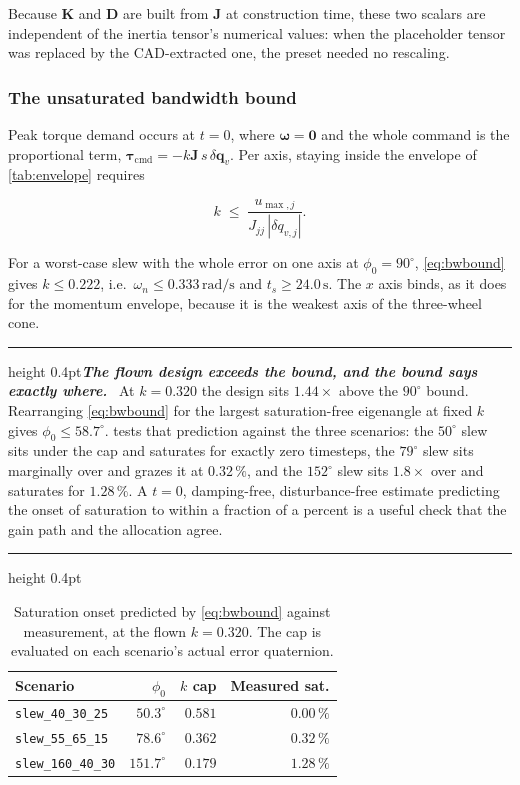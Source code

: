 \documentclass[conference,10pt,a4paper]{IEEEtran}
\newcommand{\remarkrule}{\par\nobreak\vspace{2pt}%
  \hrule height 0.4pt\vspace{4pt}\nobreak}
\newenvironment{keybox}[1][Result]
  {\par\medskip\remarkrule\noindent\small\textbf{\textit{#1.}}\ \ignorespaces}
  {\par\vspace{3pt}\hrule height 0.4pt\par\medskip\ignorespacesafterend}
\newcommand{\vect}[1]{\bm{#1}}
\newcommand{\mat}[1]{\bm{#1}}
\newcommand{\unit}[1]{\ensuremath{\,\mathrm{#1}}}
\begin{document}
Because $\mat{K}$ and $\mat{D}$ are built from $\mat{J}$ at construction time,
these two scalars are independent of the inertia tensor's numerical values:
when the placeholder tensor was replaced by the CAD-extracted one, the preset
needed no rescaling.

\subsubsection{The unsaturated bandwidth bound}

Peak torque demand occurs at $t=0$, where $\vect{\omega}=\vect{0}$ and the
whole command is the proportional term, $\vect{\tau}_\text{cmd}=-k\mat{J}\,
s\,\delta\vect{q}_v$. Per axis, staying inside the envelope of
\cref{tab:envelope} requires

\begin{equation}
k \;\le\; \frac{u_{\max,j}}{J_{jj}\,|\delta q_{v,j}|} .
\label{eq:bwbound}
\end{equation}

For a worst-case slew with the whole error on one axis at
$\phi_0=90^\circ$, \cref{eq:bwbound} gives $k\le0.222$, i.e.\
$\omega_n\le0.333\unit{rad/s}$ and $t_s\ge24.0\unit{s}$. The $x$ axis binds, as
it does for the momentum envelope, because it is the weakest axis of the
three-wheel cone.

\begin{keybox}[The flown design exceeds the bound, and the bound says exactly where]
At $k=0.320$ the design sits $1.44\times$ above the $90^\circ$ bound.
Rearranging \cref{eq:bwbound} for the largest saturation-free eigenangle at
fixed $k$ gives $\phi_0\le58.7^\circ$. \Cref{tab:satonset} tests that
prediction against the three scenarios: the $50^\circ$ slew sits under the cap
and saturates for exactly zero timesteps, the $79^\circ$ slew sits marginally
over and grazes it at $0.32\,\%$, and the $152^\circ$ slew sits $1.8\times$
over and saturates for $1.28\,\%$. A $t=0$, damping-free, disturbance-free
estimate predicting the onset of saturation to within a fraction of a percent
is a useful check that the gain path and the allocation agree.
\end{keybox}

\begin{table}[!t]
\centering
\caption{Saturation onset predicted by \cref{eq:bwbound} against measurement,
at the flown $k=0.320$. The cap is evaluated on each scenario's actual error
quaternion.}
\label{tab:satonset}
\footnotesize
\begin{tabular}{@{}lrrr@{}}
\toprule
Scenario & $\phi_0$ & $k$ cap & Measured sat. \\
\midrule
\texttt{slew\_40\_30\_25}  & $50.3^\circ$  & $0.581$ & $0.00\,\%$ \\
\texttt{slew\_55\_65\_15}  & $78.6^\circ$  & $0.362$ & $0.32\,\%$ \\
\texttt{slew\_160\_40\_30} & $151.7^\circ$ & $0.179$ & $1.28\,\%$ \\
\bottomrule
\end{tabular}
\end{table}
\end{document}
